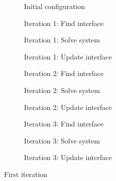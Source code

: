 \documentclass[11pt, a4paper]{article}
\begin{document}
\begin{figure}[ht]
    \centering
    \begin{subfigure}[b]{\linewidth}
        \centering
        
        \caption{Initial configuration}\label{fig:example-initial}
    \end{subfigure}
    \begin{subfigure}[b]{.32\linewidth}
        
        \caption{Iteration 1: Find interface}\label{fig:example-iter0-interface}
    \end{subfigure}
    \begin{subfigure}[b]{.32\linewidth}
        
        \caption{Iteration 1: Solve system}\label{fig:example-iter0-solution}
    \end{subfigure}
    \begin{subfigure}[b]{.32\linewidth}
        
        \caption{Iteration 1: Update interface}\label{fig:example-iter0-dumping}
    \end{subfigure}
    \begin{subfigure}[b]{.32\linewidth}
        
        \caption{Iteration 2: Find interface}\label{fig:example-iter1-interface}
    \end{subfigure}
    \begin{subfigure}[b]{.32\linewidth}
        
        \caption{Iteration 2: Solve system}\label{fig:example-iter1-solution}
    \end{subfigure}
    \begin{subfigure}[b]{.32\linewidth}
        
        \caption{Iteration 2: Update interface}\label{fig:example-iter1-dumping}
    \end{subfigure}
    \begin{subfigure}[b]{.32\linewidth}
        
        \caption{Iteration 3: Find interface}\label{fig:example-iter2-interface}
    \end{subfigure}
    \begin{subfigure}[b]{.32\linewidth}
        
        \caption{Iteration 3: Solve system}\label{fig:example-iter2-solution}
    \end{subfigure}
    \begin{subfigure}[b]{.32\linewidth}
        
        \caption{Iteration 3: Update interface}\label{fig:example-iter2-dumping}
    \end{subfigure}
    \caption{First iteration}
    \label{fig:example-iter2}
\end{figure}
\end{document}
